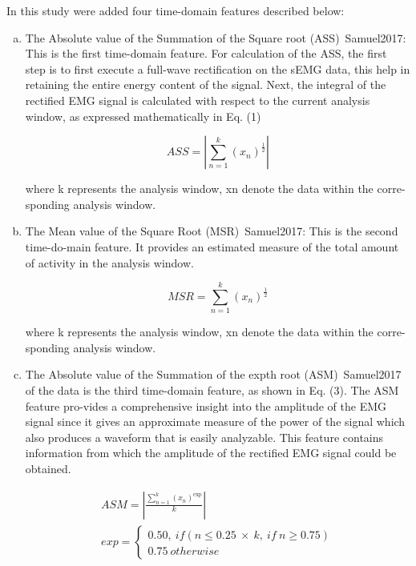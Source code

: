 \documentclass[a4paper, 12pt]{ppgeb}
\begin{document}
In this study were added four time-domain features described below:
\begin{enumerate}[(a)]
    \item The Absolute value of the Summation of the Square root (\ac{ASS})~\cite{mainreferences}{Samuel2017}: This is the first time-domain feature. For calculation of the ASS, the first step is to first execute a full-wave rectification on the sEMG data, this help in retaining the entire energy content of the signal. Next, the integral of the rectified EMG signal is calculated with respect to the current analysis window, as expressed mathematically in Eq. (1)

    \begin{equation}\label{eq:ASS}
    ASS = \left | \sum_{n=1}^{k} (x_n)^\frac{1}{2} \right |
    \end{equation}

    where k represents the analysis window, xn denote the data within the corre-sponding analysis window.
    \item The Mean value of the Square Root (\ac{MSR})~\cite{mainreferences}{Samuel2017}: This is the second time-do-main feature. It provides an estimated measure of the total amount of activity in the analysis window.

    \begin{equation}\label{eq:MSR}
    MSR = \sum_{n=1}^{k} (x_n)^\frac{1}{2}
    \end{equation}

    where k represents the analysis window, xn denote the data within the corre-sponding analysis window.

    \item The Absolute value of the Summation of the expth root (\ac{ASM})~\cite{mainreferences}{Samuel2017} of the data is the third time-domain feature, as shown in Eq. (3). The \ac{ASM} feature pro-vides a comprehensive insight into the amplitude of the EMG signal since it gives an approximate measure of the power of the signal which also produces a waveform that is easily analyzable. This feature contains information from which the amplitude of the rectified EMG signal could be obtained.

    \begin{equation}\label{eq:ASM}
        \begin{split}
        ASM = \left | \frac {\sum_{n=1}^{k} (x_n)^{\exp}}{k} \right | \\
        exp = \begin{cases} 
            {0.50, \:if (n \leq 0 .25\: \times\: k, \:if \:n \geq 0 .75 )}\\
            {0.75 \:otherwise}
            \end{cases}
        \end{split}
    \end{equation}


\end{enumerate}
\end{document}
